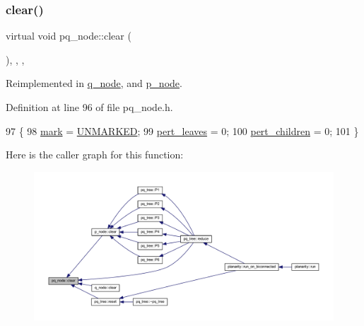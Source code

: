 \subsubsection{\texorpdfstring{clear()}{clear()}}
{\footnotesize\ttfamily virtual void pq\+\_\+node\+::clear (\begin{DoxyParamCaption}{ }\end{DoxyParamCaption})\hspace{0.3cm}{\ttfamily [inline]}, {\ttfamily [protected]}, {\ttfamily [virtual]}, {\ttfamily [inherited]}}



Reimplemented in \mbox{\hyperlink{classq__node_a47908b6f23cab25667f20eb41ad2f09d}{q\+\_\+node}}, and \mbox{\hyperlink{classp__node_af24fe11743b0836b03c108a1bf8a0995}{p\+\_\+node}}.



Definition at line 96 of file pq\+\_\+node.\+h.


\begin{DoxyCode}
97     \{
98     \mbox{\hyperlink{classpq__node_aee913582a7b268ce2570bee8a8367c50}{mark}} = \mbox{\hyperlink{classpq__node_a6236b20cd5f6cc02cb5f637ed34c96d9a7fbe5f6a363f9f2b5a154c61b2389d59}{UNMARKED}};
99     \mbox{\hyperlink{classpq__node_a3fb78609f93f41efd6826ed3169fc312}{pert\_leaves}} = 0;
100     \mbox{\hyperlink{classpq__node_a8d8fb7b3059e7aeecf62eeed34076afb}{pert\_children}} = 0;
101     \}
\end{DoxyCode}
Here is the caller graph for this function\+:
\nopagebreak
\begin{figure}[H]
\begin{center}
\leavevmode
\includegraphics[width=350pt]{classpq__node_a13100e0b030cc047f382d9ddf6a44f4a_icgraph}
\end{center}
\end{figure}
\mbox{\label{classdirection__indicator_aef2ff42f0a64c7d10fbf42059c008f38}} 
